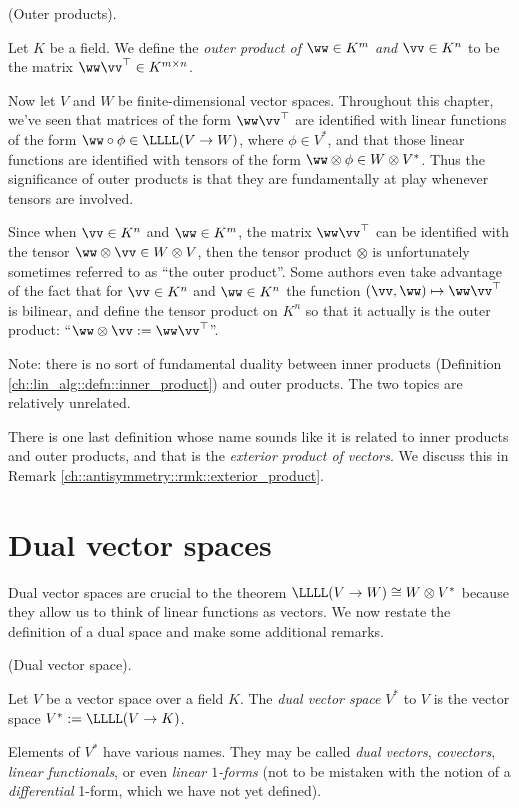 \begin{defn}
\label{ch::motivated_intro::rmk::outer_products}
    (Outer products).

    Let $K$ be a field. We define the \textit{outer product of $\ww \in K^m$ and $\vv \in K^n$} to be the matrix $\ww \vv^\top \in K^{m \times n}$. 
    
    Now let $V$ and $W$ be finite-dimensional vector spaces. Throughout this chapter, we've seen that matrices of the form $\ww \vv^\top$ are identified with linear functions of the form $\ww \circ \phi \in \LLLL(V \rightarrow W)$, where $\phi \in V^*$, and that those linear functions are identified with tensors of the form $\ww \otimes \phi \in W \otimes V^*$. Thus the significance of outer products is that they are fundamentally at play whenever tensors are involved.
    
    Since when $\vv \in K^n$ and $\ww \in K^m$, the matrix $\ww \vv^\top$ can be identified with the tensor $\ww \otimes \vv \in W \otimes V$, then the tensor product $\otimes$ is unfortunately sometimes referred to as ``the outer product''. Some authors even take advantage of the fact that for $\vv \in K^n$ and $\ww \in K^n$ the function $(\vv, \ww) \mapsto \ww \vv^\top$ is bilinear, and define the tensor product on $K^n$ so that it actually is the outer product: ``$\ww \otimes \vv := \ww \vv^\top$''.

    Note: there is no sort of fundamental duality between inner products (Definition \ref{ch::lin_alg::defn::inner_product}) and outer products. The two topics are relatively unrelated.

    There is one last definition whose name sounds like it is related to inner products and outer products, and that is the \textit{exterior product of vectors}. We discuss this in Remark \ref{ch::antisymmetry::rmk::exterior_product}.
\end{defn}

\newpage

\section{Dual vector spaces}

Dual vector spaces are crucial to the theorem $\LLLL(V \rightarrow W) \cong W \otimes V^*$ because they allow us to think of linear functions as vectors. We now restate the definition of a dual space and make some additional remarks.

\begin{defn}
\label{ch::motivated_intro::defn::dual_space_2}
    (Dual vector space).
    
    Let $V$ be a vector space over a field $K$. The \textit{dual vector space} $V^*$ to $V$ is the vector space $V^* := \LLLL(V \rightarrow K)$.

    Elements of $V^*$ have various names. They may be called \textit{dual vectors}, \textit{covectors}, \textit{linear functionals}, or even \textit{linear $1$-forms} (not to be mistaken with the notion of a \textit{differential} 1-form, which we have not yet defined).
\end{defn}

